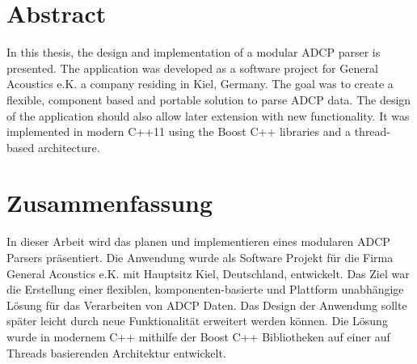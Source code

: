 \chapter*{Abstract}
In this thesis, the design and implementation of a modular ADCP parser is presented. The application was developed as a software project for General Acoustics e.K. a company residing in Kiel, Germany. The goal was to create a flexible, component based and portable solution to parse ADCP data. The design of the application should also allow later extension with new functionality. It was implemented in modern C++11 using the Boost C++ libraries and a thread-based architecture.
\chapter*{Zusammenfassung}
In dieser Arbeit wird das planen und implementieren eines modularen ADCP Parsers präsentiert. Die Anwendung wurde als Software Projekt für die Firma General Acoustics e.K. mit Hauptsitz Kiel, Deutschland, entwickelt. Das Ziel war die Erstellung einer flexiblen, komponenten-basierte und Plattform unabhängige Lösung für das Verarbeiten von ADCP Daten. Das Design der Anwendung sollte später leicht durch neue Funktionalität erweitert werden können. Die Lösung wurde in modernem C++ mithilfe der Boost C++ Bibliotheken auf einer auf Threads basierenden Architektur entwickelt.


